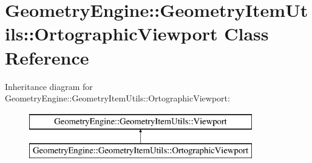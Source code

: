\hypertarget{class_geometry_engine_1_1_geometry_item_utils_1_1_ortographic_viewport}{}\section{Geometry\+Engine\+::Geometry\+Item\+Utils\+::Ortographic\+Viewport Class Reference}
\label{class_geometry_engine_1_1_geometry_item_utils_1_1_ortographic_viewport}
Inheritance diagram for Geometry\+Engine\+::Geometry\+Item\+Utils\+::Ortographic\+Viewport\+:\begin{figure}[H]
\begin{center}
\leavevmode
\includegraphics[height=2.000000cm]{class_geometry_engine_1_1_geometry_item_utils_1_1_ortographic_viewport}
\end{center}
\end{figure}
